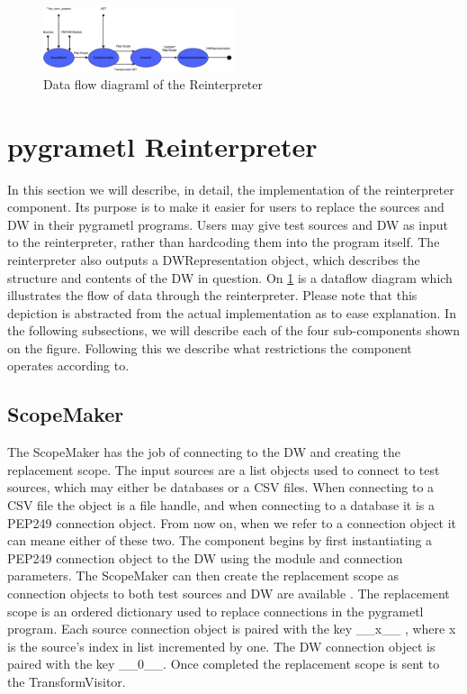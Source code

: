 \begin{figure}
\centering
\includegraphics[width=0.5\textwidth]{figures/reinterpreter.pdf}
\caption{Data flow diagraml of the Reinterpreter}
\label{fig:reinterpreter}
\end{figure}


\section{pygrametl Reinterpreter}


In this section we will describe, in detail, the implementation of the reinterpreter component. Its purpose is to make it easier for users to replace the sources and DW in their pygrametl programs. Users may give test sources and DW as input to the reinterpreter, rather than hardcoding them into the program itself. The reinterpreter also outputs a DWRepresentation object, which describes the structure and contents of the DW in question. On \cref{fig:reinterpreter} is a dataflow diagram which illustrates the flow of data through the reinterpreter. Please note that this depiction is abstracted from the actual implementation as to ease explanation. In the following subsections, we will describe each of the four sub-components shown on the figure. Following this we describe what restrictions the component operates according to.

\subsection{ScopeMaker}
The ScopeMaker has the job of connecting to the DW and creating the replacement scope. The input sources are a list objects used to connect to test sources, which may either be databases or a CSV files. When connecting to a CSV file the object is a file handle, and when connecting to a database it is a PEP249 connection object. From now on, when we refer to a connection object it can meane either of these two. The component begins by first instantiating a PEP249 connection object to the DW using the module and connection parameters. The ScopeMaker can then create the replacement scope as connection objects to both test sources and DW are available . The replacement scope is an ordered dictionary used to replace connections in the pygrametl program. Each source connection object is paired with the key \_\_x\_\_ , where x is the source's index in list incremented by one. The DW connection object is paired with the key \_\_0\_\_. Once completed the replacement scope is sent to the TransformVisitor.

